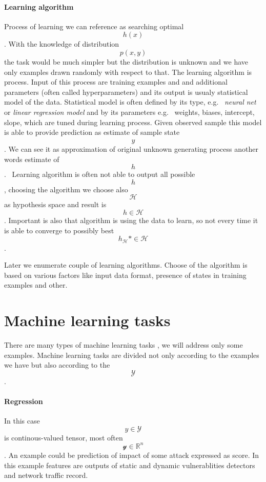 \paragraph{Learning algorithm}
Process of learning we can reference as searching optimal $$h(x)$$. With the knowledge of distribution $$p(x,y)$$ the task would be much simpler but the distribution is unknown and we have only examples drawn randomly with respect to that. The learning algorithm is process. Input of this process are training examples and and additional parameters (often called hyperparameters) and its output is usualy statistical model of the data. Statistical model is often defined by its type, e.g. \ \emph{neural net} or \emph{linear regression model} and by its parameters e.g. \ weights, biases, intercept, slope, which are tuned during learning process. Given observed sample this model is able to provide prediction as estimate of sample state $$\hat{y}$$. We can see it as approximation of original unknown generating process another words estimate of $$h$$. \
Learning algorithm is often not able to output all possible $$h$$, choosing the algorithm we choose also $$\mathcal{H}$$ as hypothesis space and result is $$h \in \mathcal{H}$$. Important is also that algorithm is using the data to learn, so not every time it is able to converge to possibly best $$h_{\mathcal{H}}* \in \mathcal{H}$$.

Later we enumerate couple of learning algorithms. Choose of the algorithm is based on various factors like input data format, presence of states in training examples and other.



\section{Machine learning tasks}
There are many types of machine learning tasks \citet{GoodBengCour16}, we will address only some examples. Machine learning tasks are divided not only according to the examples we have but also according to the $$\mathcal{Y}$$.

\paragraph{Regression}
In this case $$y \in \mathcal{Y}$$ is continous-valued tensor, most often $$\mathcal{y} \in \mathbb{R}^{n}$$. An example could be prediction of impact of some attack expressed as score. In this example features are outputs of static and dynamic vulnerablities detectors and network traffic record. \cite{Jaganathan2015}

